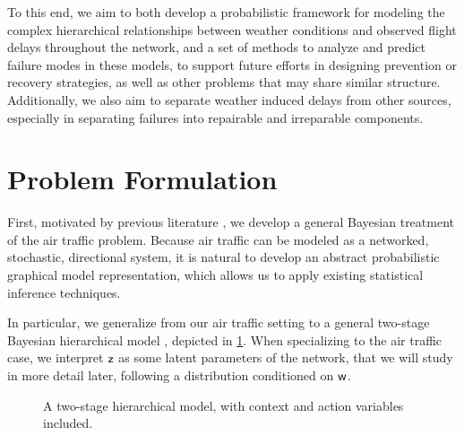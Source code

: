 To this end, we aim to both develop a probabilistic framework for modeling the complex hierarchical relationships between weather conditions and observed flight delays throughout the network, and a set of methods to analyze and predict failure modes in these models, to support future efforts in designing prevention or recovery strategies, as well as other problems that may share similar structure. Additionally, we also aim to separate weather induced delays from other sources, especially in separating failures into repairable and irreparable components.

\section{Problem Formulation}
\label{sec:intro-formulation}

First, motivated by previous literature \cite{michael_peng_probing_2024, dawson2025rare}, we develop a general Bayesian treatment of the air traffic problem. Because air traffic can be modeled as a networked, stochastic, directional system, it is natural to develop an abstract probabilistic graphical model representation, which allows us to apply existing statistical inference techniques.

In particular, we generalize from our air traffic setting to a general two-stage Bayesian hierarchical model \cite{Allenby_Rossi_McCulloch_2005}, depicted in \cref{fig:wzx-basic}. When specializing to the air traffic case, we interpret $\mathsf z$ as some latent parameters of the network, that we will study in more detail later, following a distribution conditioned on $\mathsf w$.

\begin{figure} [htb!]
    \centering
    \caption{A two-stage hierarchical model, with context and action variables included.}
    \label{fig:wzx-basic}
\end{figure}

